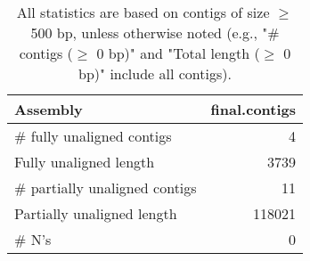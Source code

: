 \documentclass[12pt,a4paper]{article}
\begin{document}
\begin{table}[ht]
\begin{center}
\caption{All statistics are based on contigs of size $\geq$ 500 bp, unless otherwise noted (e.g., "\# contigs ($\geq$ 0 bp)" and "Total length ($\geq$ 0 bp)" include all contigs).}
\begin{tabular}{|l*{1}{|r}|}
\hline
Assembly & final.contigs \\ \hline
\# fully unaligned contigs & 4 \\ \hline
Fully unaligned length & 3739 \\ \hline
\# partially unaligned contigs & 11 \\ \hline
Partially unaligned length & 118021 \\ \hline
\# N's & 0 \\ \hline
\end{tabular}
\end{center}
\end{table}
\end{document}
